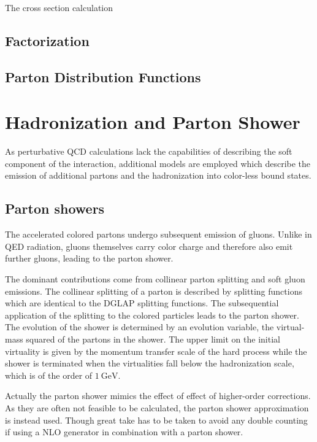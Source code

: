 The cross section calculation 

\subsection{Factorization}


\subsection{Parton Distribution Functions}

\section{Hadronization and Parton Shower}

As perturbative QCD calculations lack the capabilities of describing the
soft component of the interaction, additional models are employed which describe
the emission of additional partons and the hadronization into color-less bound
states. 

\subsection{Parton showers}

The accelerated colored partons undergo subsequent emission of gluons. Unlike in
QED radiation, gluons themselves carry color charge and therefore also emit
further gluons, leading to the parton shower. 

The dominant contributions come from collinear parton splitting and soft gluon
emissions. The collinear splitting of a parton is described by splitting
functions which are identical to the DGLAP splitting functions. The
subsequential application of the splitting to the colored particles leads to the
parton shower. The evolution of the shower is determined by an evolution
variable, \eg the virtual-mass squared of the partons in the shower. The upper
limit on the initial virtuality is given by the momentum transfer scale of the
hard process while the shower is terminated when the virtualities fall below the
hadronization scale, which is of the order of $\SI{1}{\GeV}$.

Actually the parton shower mimics the effect of effect of higher-order
corrections. As they are often not feasible to be calculated, the parton shower
approximation is instead used. Though great take has to be taken to avoid any
double counting if using a NLO generator in combination with a parton shower.


